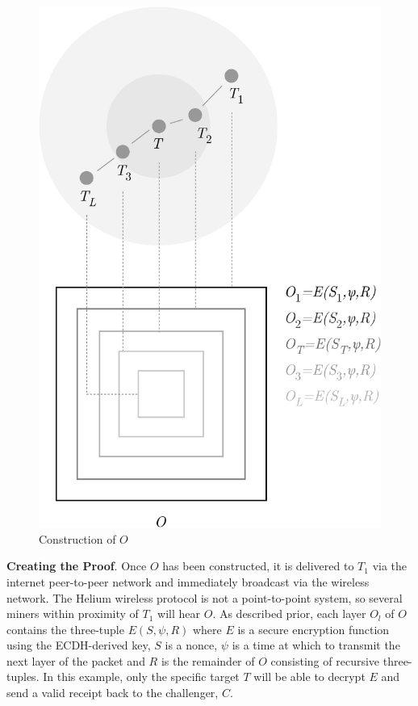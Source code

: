 \documentclass[UTF8, 10pt, nonatbib, nocopyrightspace, reprint]{sigplanconf}
\begin{document}
\begin{figure}[ht]
    \begin{center}
          \includegraphics[width=\columnwidth]{o_construction.eps}
          \caption{Construction of $O$}
          \label{fig:poc-o_construction}
     \end{center}
\end{figure}

\textbf{Creating the Proof}. Once $O$ has been constructed, it is delivered to $T_1$ via the internet peer-to-peer network and immediately broadcast via the wireless network. The Helium wireless protocol is not a point-to-point system, so several miners within proximity of $T_1$ will hear $O$. As described prior, each layer $O_l$ of $O$ contains the three-tuple ${E\left(S, \psi, R\right)}$ where $E$ is a secure encryption function using the ECDH-derived key, $S$ is a nonce, $\psi$ is a time at which to transmit the next layer of the packet and $R$ is the remainder of $O$ consisting of recursive three-tuples. In this example, only the specific target $T$ will be able to decrypt $E$ and send a valid receipt back to the challenger, $C$.
\end{document}
